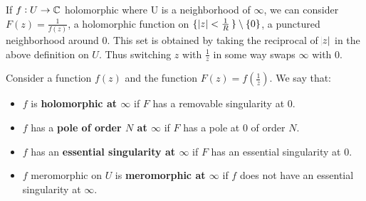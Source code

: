 \begin{center}
    

\end{center}



























If $f:U \to \mathbb{C}$ holomorphic where U is a neighborhood of $\infty$, we can consider $F(z) = \frac{1}{f(z)}$, a holomorphic function on $\set{\abs{z} < \frac{1}{R}} \setminus \{ 0 \}$, a punctured neighborhood around $0$. This set is obtained by taking the reciprocal of $\abs{z}$ in the above definition on $U$. Thus switching $z$ with $\frac{1}{z}$ in some way swaps $\infty$ with $0$.

\begin{definition}
Consider a function $f(z)$ and the function $F(z) = f(\frac{1}{z})$. We say that:
\begin{itemize}
    \item $f$ is \textbf{holomorphic at $\infty$} if $F$ has a removable singularity at $0$.
    \item $f$ has a \textbf{pole of order $N$ at $\infty$} if $F$ has a pole at $0$ of order $N$.
    \item $f$ has an \textbf{essential singularity at $\infty$} if $F$ has an essential singularity at $0$.
    \item $f$ meromorphic on $U$ is \textbf{meromorphic at $\infty$} if $f$ does not have an essential singularity at $\infty$.
\end{itemize}
\end{definition}


